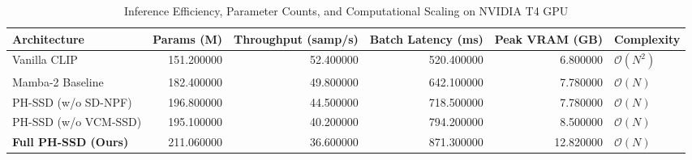\begin{table}
\caption{Inference Efficiency, Parameter Counts, and Computational Scaling on NVIDIA T4 GPU}
\label{tab:efficiency_results}
\begin{tabular}{lrrrrl}
\toprule
Architecture & Params (M) & Throughput (samp/s) & Batch Latency (ms) & Peak VRAM (GB) & Complexity \\
\midrule
Vanilla CLIP & 151.200000 & 52.400000 & 520.400000 & 6.800000 & $\mathcal{O}(N^2)$ \\
Mamba-2 Baseline & 182.400000 & 49.800000 & 642.100000 & 7.780000 & $\mathcal{O}(N)$ \\
PH-SSD (w/o SD-NPF) & 196.800000 & 44.500000 & 718.500000 & 7.780000 & $\mathcal{O}(N)$ \\
PH-SSD (w/o VCM-SSD) & 195.100000 & 40.200000 & 794.200000 & 8.500000 & $\mathcal{O}(N)$ \\
\textbf{Full PH-SSD (Ours)} & 211.060000 & 36.600000 & 871.300000 & 12.820000 & $\mathcal{O}(N)$ \\
\bottomrule
\end{tabular}
\end{table}
